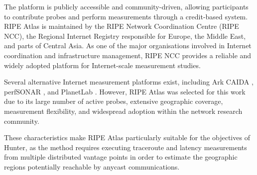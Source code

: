The platform is publicly accessible and community-driven, allowing participants to contribute probes and perform measurements through a credit-based system. RIPE Atlas is maintained by the RIPE Network Coordination Centre (RIPE NCC), the Regional Internet Registry responsible for Europe, the Middle East, and parts of Central Asia. As one of the major organisations involved in Internet coordination and infrastructure management, RIPE NCC provides a reliable and widely adopted platform for Internet-scale measurement studies.

Several alternative Internet measurement platforms exist, including Ark CAIDA \cite{ArkCAIDA}, perfSONAR \cite{PerfSONAR}, and PlanetLab \cite{HomePlanetLab}. However, RIPE Atlas was selected for this work due to its large number of active probes, extensive geographic coverage, measurement flexibility, and widespread adoption within the network research community.

These characteristics make RIPE Atlas particularly suitable for the objectives of Hunter, as the method requires executing traceroute and latency measurements from multiple distributed vantage points in order to estimate the geographic regions potentially reachable by anycast communications.
